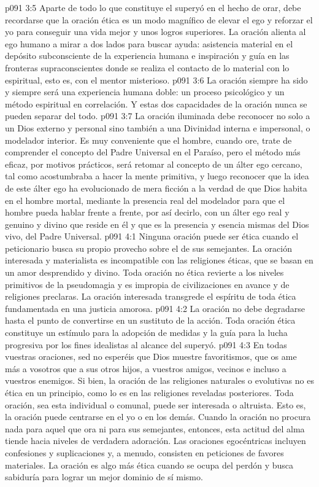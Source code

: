 \vs p091 3:5 Aparte de todo lo que constituye el superyó en el hecho de orar, debe recordarse que la oración ética es un modo magnífico de elevar el ego y reforzar el yo para conseguir una vida mejor y unos logros superiores. La oración alienta al ego humano a mirar a dos lados para buscar ayuda: asistencia material en el depósito subconsciente de la experiencia humana e inspiración y guía en las fronteras supraconscientes donde se realiza el contacto de lo material con lo espiritual, esto es, con el mentor misterioso.
\vs p091 3:6 La oración siempre ha sido y siempre será una experiencia humana doble: un proceso psicológico y un método espiritual en correlación. Y estas dos capacidades de la oración nunca se pueden separar del todo.
\vs p091 3:7 La oración iluminada debe reconocer no solo a un Dios externo y personal sino también a una Divinidad interna e impersonal, o modelador interior. Es muy conveniente que el hombre, cuando ore, trate de comprender el concepto del Padre Universal en el Paraíso, pero el método más eficaz, por motivos prácticos, será retomar al concepto de un álter ego cercano, tal como acostumbraba a hacer la mente primitiva, y luego reconocer que la idea de este álter ego ha evolucionado de mera ficción a la verdad de que Dios habita en el hombre mortal, mediante la presencia real del modelador para que el hombre pueda hablar frente a frente, por así decirlo, con un álter ego real y genuino y divino que reside en él y que es la presencia y esencia mismas del Dios vivo, del Padre Universal.
\vs p091 4:1 Ninguna oración puede ser ética cuando el peticionario busca su propio provecho sobre el de sus semejantes. La oración interesada y materialista es incompatible con las religiones éticas, que se basan en un amor desprendido y divino. Toda oración no ética revierte a los niveles primitivos de la pseudomagia y es impropia de civilizaciones en avance y de religiones preclaras. La oración interesada transgrede el espíritu de toda ética fundamentada en una justicia amorosa.
\vs p091 4:2 La oración no debe degradarse hasta el punto de convertirse en un sustituto de la acción. Toda oración ética constituye un estímulo para la adopción de medidas y la guía para la lucha progresiva por los fines idealistas al alcance del superyó.
\vs p091 4:3 En todas vuestras oraciones, sed  no esperéis que Dios muestre favoritismos, que os ame más a vosotros que a sus otros hijos, a vuestros amigos, vecinos e incluso a vuestros enemigos. Si bien, la oración de las religiones naturales o evolutivas no es ética en un principio, como lo es en las religiones reveladas posteriores. Toda oración, sea esta individual o comunal, puede ser interesada o altruista. Esto es, la oración puede centrarse en el yo o en los demás. Cuando la oración no procura nada para aquel que ora ni para sus semejantes, entonces, esta actitud del alma tiende hacia niveles de verdadera adoración. Las oraciones egocéntricas incluyen confesiones y suplicaciones y, a menudo, consisten en peticiones de favores materiales. La oración es algo más ética cuando se ocupa del perdón y busca sabiduría para lograr un mejor dominio de sí mismo.
